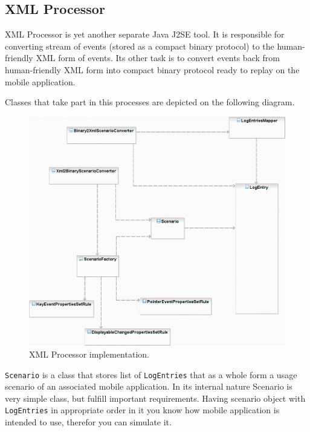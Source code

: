 \subsection{XML Processor}

XML Processor is yet another separate Java J2SE tool. It is responsible for converting
stream of events (stored as a compact binary protocol) to the human-friendly
XML form of events. Its other task is to convert events back from human-friendly
XML form into compact binary protocol ready to replay on the mobile application.

Classes that take part in this processes are depicted on the following diagram.

\begin{figure}[t]%
\begin{center}
\includegraphics[width=\linewidth]{figures/uml-diagram-xmlprocessor}
\end{center}
\caption{XML Processor implementation.}%
\label{fig:uml-diagram-xmlprocessor}
\end{figure}

\texttt{Scenario} is a class that stores list of \texttt{LogEntries} that as a whole
form a usage scenario of an associated mobile application. In its internal
nature Scenario is very simple class, but fulfill important requirements.
Having scenario object with \texttt{LogEntries} in appropriate order in it you
know how mobile application is intended to use, therefor you can simulate
it.

